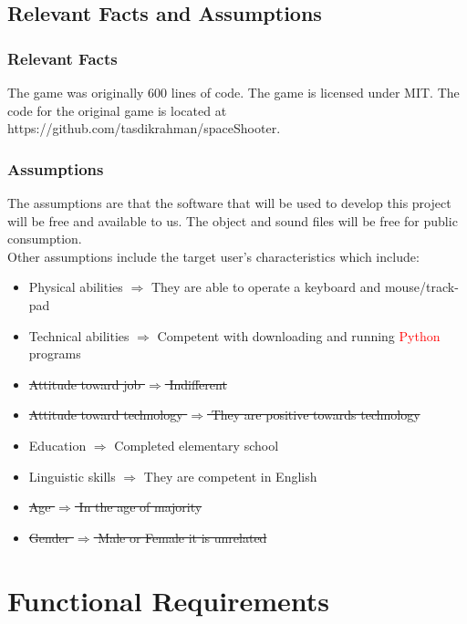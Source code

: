 \documentclass[12pt, titlepage]{article}
\begin{document}
\newpage

\subsection{Relevant Facts and Assumptions}

\subsubsection{Relevant Facts}
The game was originally 600 lines of code. The game is licensed under MIT. The code for the original game is located at https://github.com/tasdikrahman/spaceShooter.

\subsubsection{Assumptions}

The assumptions are that the software that will be used to develop this project will be free and available to us. The object and sound files will be free for public consumption. 
\newline
\\Other assumptions include the target user's characteristics which include:
\begin{itemize}
\item Physical abilities $\Rightarrow$ They are able to operate a keyboard and mouse/track-pad
\item Technical abilities $\Rightarrow$ Competent with downloading and running \textcolor{red}{Python} programs
\item \sout{Attitude toward job $\Rightarrow$ Indifferent}
\item \sout{Attitude toward technology $\Rightarrow$ They are positive towards technology}
\item Education $\Rightarrow$ Completed elementary school
\item Linguistic skills $\Rightarrow$ They are competent in English
\item \sout{Age $\Rightarrow$ In the age of majority}
\item \sout{Gender $\Rightarrow$ Male or Female it is unrelated}
\end{itemize}

\newpage

\section{Functional Requirements}
\end{document}
